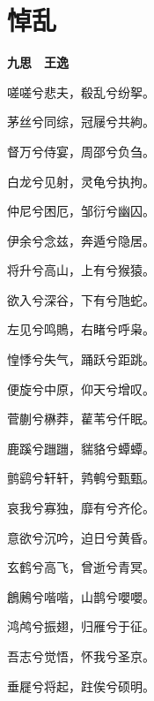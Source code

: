 \documentclass[12pt,a4paper]{ctexbook}
\begin{document}
\section{悼乱}
\textbf{九思　王逸}\par\vspace{0.5em}
嗟嗟兮悲夫，殽乱兮纷挐。\par
茅丝兮同综，冠屦兮共絇。\par
督万兮侍宴，周邵兮负刍。\par
白龙兮见射，灵龟兮执拘。\par
仲尼兮困厄，邹衍兮幽囚。\par
伊余兮念兹，奔遁兮隐居。\par
将升兮高山，上有兮猴猿。\par
欲入兮深谷，下有兮虺蛇。\par
左见兮鸣鵙，右睹兮呼枭。\par
惶悸兮失气，踊跃兮距跳。\par
便旋兮中原，仰天兮增叹。\par
菅蒯兮楙莽，雚苇兮仟眠。\par
鹿蹊兮躖躖，貒貉兮蟫蟫。\par
鹯鹞兮轩轩，鹑鹌兮甄甄。\par
哀我兮寡独，靡有兮齐伦。\par
意欲兮沉吟，迫日兮黄昏。\par
玄鹤兮高飞，曾逝兮青冥。\par
鶬鶊兮喈喈，山鹊兮嚶嚶。\par
鸿鸬兮振翅，归雁兮于征。\par
吾志兮觉悟，怀我兮圣京。\par
垂屣兮将起，跓俟兮硕明。\par
\end{document}
